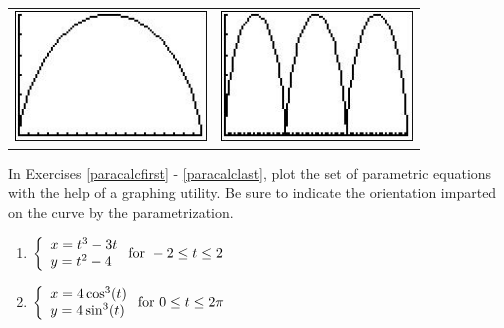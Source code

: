 \begin{center}

\begin{tabular}{cc}

\includegraphics[width=2in]{./ParametricEquationsGraphics/Parametric05.jpg} &
\hspace{0.75in} \includegraphics[width=2in]{./ParametricEquationsGraphics/Parametric06.jpg} \\


\end{tabular} 
\end{center}


In Exercises \ref{paracalcfirst} - \ref{paracalclast}, plot the set of parametric equations with the help of a graphing utility.  Be sure to indicate the orientation imparted on the curve by the parametrization.  

\begin{multicols}{2} \raggedcolumns 
\begin{enumerate}
\setcounter{enumi}{\value{HW}}


\item ${\displaystyle \left\{ \begin{array}{l} x = t^{3} - 3t \\ y = t^{2} - 4 \end{array} \right. \vspace{.25in} \mbox{for } -2 \leq t \leq 2}$ \label{paracalcfirst}
\item ${\displaystyle \left\{ \begin{array}{l} x = 4\cos^{3}(t) \\ y = 4\sin^{3}(t) \end{array} \right. \vspace{.25in} \mbox{for } 0 \leq t \leq 2\pi}$

\setcounter{HW}{\value{enumi}}
\end{enumerate}
\end{multicols}


